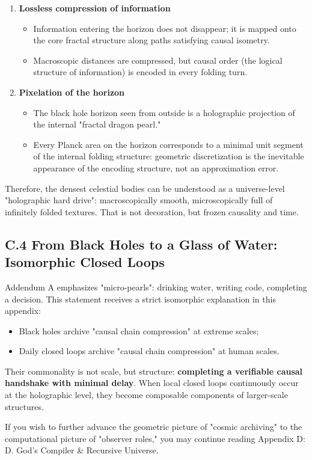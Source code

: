 \begin{enumerate}
\item \textbf{Lossless compression of information}
\begin{itemize}
\item Information entering the horizon does not disappear; it is mapped onto the core fractal structure along paths satisfying causal isometry.
\item Macroscopic distances are compressed, but causal order (the logical structure of information) is encoded in every folding turn.
\end{itemize}
\item \textbf{Pixelation of the horizon}
\begin{itemize}
\item The black hole horizon seen from outside is a holographic projection of the internal "fractal dragon pearl."
\item Every Planck area on the horizon corresponds to a minimal unit segment of the internal folding structure: geometric discretization is the inevitable appearance of the encoding structure, not an approximation error.
\end{itemize}
\end{enumerate}

Therefore, the densest celestial bodies can be understood as a universe-level "holographic hard drive": macroscopically smooth, microscopically full of infinitely folded textures. That is not decoration, but frozen causality and time.

\subsection*{C.4 From Black Holes to a Glass of Water: Isomorphic Closed Loops}

Addendum A emphasizes "micro-pearls": drinking water, writing code, completing a decision. This statement receives a strict isomorphic explanation in this appendix:

\begin{itemize}
\item Black holes archive "causal chain compression" at extreme scales;
\item Daily closed loops archive "causal chain compression" at human scales.
\end{itemize}

Their commonality is not scale, but structure: \textbf{completing a verifiable causal handshake with minimal delay}. When local closed loops continuously occur at the holographic level, they become composable components of larger-scale structures.

If you wish to further advance the geometric picture of "cosmic archiving" to the computational picture of "observer roles," you may continue reading Appendix D: D. God's Compiler \& Recursive Universe.

